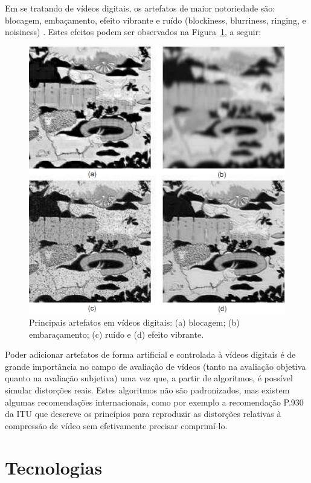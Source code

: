 Em se tratando de vídeos digitais, os artefatos de maior notoriedade são: blocagem, embaçamento, efeito vibrante e ruído (blockiness, blurriness, ringing, e noisiness) \cite{farias2007}. Estes efeitos podem ser observados na Figura~\ref{fig:artefatosdigitais}, a seguir:

\begin{figure}[!htb]
	\centering
	\includegraphics[scale=0.45]{./imgs/figura1.png}
	\caption{Principais artefatos em vídeos digitais: (a) blocagem; (b) embaraçamento; (c) ruído e (d) efeito vibrante.}
	\label{fig:artefatosdigitais}
\end{figure}


Poder adicionar artefatos de forma artificial e controlada à vídeos digitais é de grande importância no campo de avaliação de vídeos (tanto na avaliação objetiva quanto na avaliação subjetiva) uma vez que, a partir de algoritmos, é possível simular distorções reais. Estes algoritmos não são padronizados, mas existem algumas recomendações internacionais, como por exemplo a recomendação P.930 da ITU \cite{itup930} que descreve os princípios para reproduzir as distorções relativas à compressão de vídeo sem efetivamente precisar comprimí-lo.



\section{Tecnologias}
